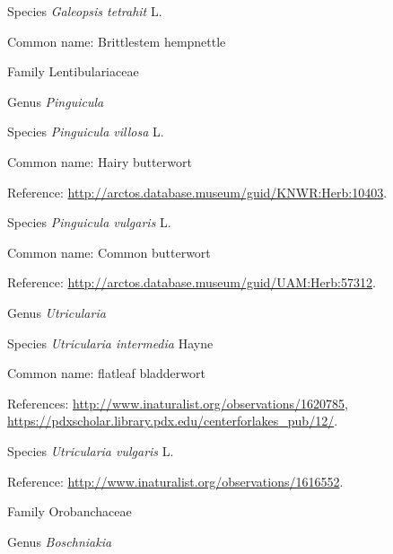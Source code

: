 \documentclass[9pt, article]{memoir}
\begin{document}
\begin{multicols}{2}
\vspace{6pt}\noindent\hspace{36pt}Species \textit{Galeopsis tetrahit} L.


Common name: Brittlestem hempnettle

\vspace{6pt}\noindent\hspace{24pt}Family Lentibulariaceae


\vspace{6pt}\noindent\hspace{30pt}Genus \textit{Pinguicula}


\vspace{6pt}\noindent\hspace{36pt}Species \textit{Pinguicula villosa} L.


Common name: Hairy butterwort

Reference: 
\url{http://arctos.database.museum/guid/KNWR:Herb:10403}.

\vspace{6pt}\noindent\hspace{36pt}Species \textit{Pinguicula vulgaris} L.


Common name: Common butterwort

Reference: 
\url{http://arctos.database.museum/guid/UAM:Herb:57312}.

\vspace{6pt}\noindent\hspace{30pt}Genus \textit{Utricularia}


\vspace{6pt}\noindent\hspace{36pt}Species \textit{Utricularia intermedia} Hayne


Common name: flatleaf bladderwort

References: 
\url{http://www.inaturalist.org/observations/1620785}, 
\url{https://pdxscholar.library.pdx.edu/centerforlakes_pub/12/}.

\vspace{6pt}\noindent\hspace{36pt}Species \textit{Utricularia vulgaris} L.


Reference: 
\url{http://www.inaturalist.org/observations/1616552}.

\vspace{6pt}\noindent\hspace{24pt}Family Orobanchaceae


\vspace{6pt}\noindent\hspace{30pt}Genus \textit{Boschniakia}



\end{multicols}
\end{document}
